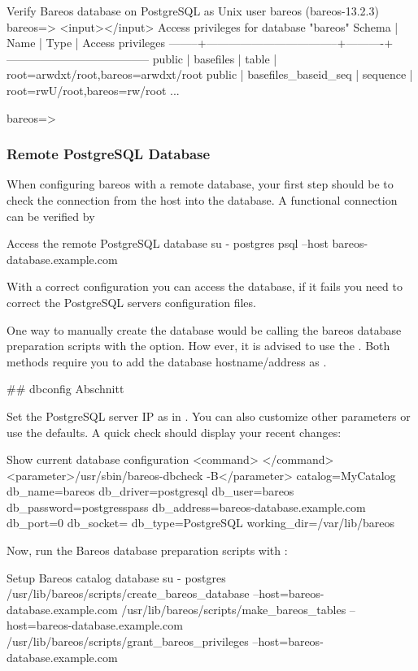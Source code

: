 \begin{commands}{Verify Bareos database on PostgreSQL as Unix user bareos (bareos-13.2.3)}
bareos=> <input>\dp</input>
                 Access privileges for database "bareos"
 Schema |               Name                |   Type   |  Access privileges
--------+-----------------------------------+----------+--------------------------------------
 public | basefiles                         | table    | {root=arwdxt/root,bareos=arwdxt/root}
 public | basefiles_baseid_seq              | sequence | {root=rwU/root,bareos=rw/root}
...

bareos=>
\end{commands}

\subsubsection{Remote PostgreSQL Database}
\label{catalog-maintenance-remote-psql}

When configuring bareos with a remote database, your first step should be to check the connection from the \bareosDir host into the database.
A functional connection can be verified by 
\begin{commands}{Access the remote PostgreSQL database}
su - postgres
psql --host bareos-database.example.com
\end{commands}
With a correct configuration you can access the database, if it fails you need to correct the PostgreSQL servers configuration files.

One way to manually create the database would be calling the bareos database preparation scripts with the  option.
How ever, it is advised to use the . 
Both methods require you to add the database hostname/address as .

## dbconfig Abschnitt

Set the PostgreSQL server IP as  in .
You can also customize other parameters or use the defaults. A quick check should display your recent changes:
\begin{commands}{Show current database configuration}
<command> </command><parameter>/usr/sbin/bareos-dbcheck -B</parameter>
catalog=MyCatalog
db_name=bareos
db_driver=postgresql
db_user=bareos
db_password=postgresspass
db_address=bareos-database.example.com
db_port=0
db_socket=
db_type=PostgreSQL
working_dir=/var/lib/bareos
\end{commands}

Now, run the Bareos database preparation scripts with : 
\begin{commands}{Setup Bareos catalog database}
su - postgres
/usr/lib/bareos/scripts/create_bareos_database --host=bareos-database.example.com
/usr/lib/bareos/scripts/make_bareos_tables --host=bareos-database.example.com
/usr/lib/bareos/scripts/grant_bareos_privileges --host=bareos-database.example.com
\end{commands}


